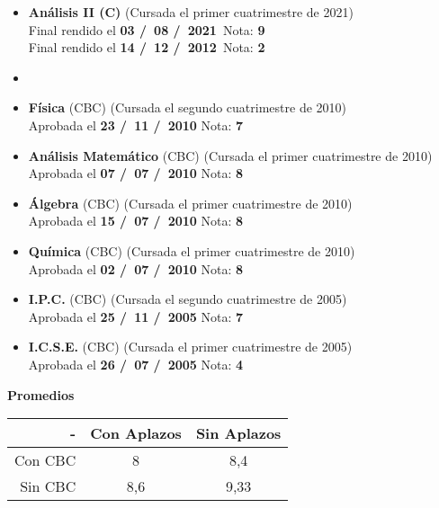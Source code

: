 \begin{itemize}[leftmargin=0.8cm]
  \item{\textbf{Análisis II (C)} (Cursada el primer cuatrimestre de 2021)\\
  Final rendido el \textbf{03 \slash \ 08 \slash \ 2021}\ \hfill Nota: \textbf{9}}\\
  Final rendido el \textbf{14 \slash \ 12 \slash \ 2012}\ \hfill Nota: \textbf{2}

  \item[] %

  \item{\textbf{Física} (CBC) (Cursada el segundo cuatrimestre de 2010)\\
  Aprobada el \textbf{23 \slash \ 11 \slash \ 2010} \hfill Nota: \textbf{7}}

  \item{\textbf{Análisis Matemático} (CBC) (Cursada el primer cuatrimestre de 2010)\\
  Aprobada el \textbf{07 \slash \ 07 \slash \ 2010} \hfill Nota: \textbf{8}}

  \item{\textbf{Álgebra} (CBC) (Cursada el primer cuatrimestre de 2010)\\
  Aprobada el \textbf{15 \slash \ 07 \slash \ 2010} \hfill Nota: \textbf{8}}

  \item{\textbf{Química} (CBC) (Cursada el primer cuatrimestre de 2010)\\
  Aprobada el \textbf{02 \slash \ 07 \slash \ 2010} \hfill Nota: \textbf{8}}

  \item{\textbf{I.P.C.} (CBC) (Cursada el segundo cuatrimestre de 2005)\\
  Aprobada el \textbf{25 \slash \ 11 \slash \ 2005} \hfill Nota: \textbf{7}}

  \item{\textbf{I.C.S.E.} (CBC) (Cursada el primer cuatrimestre de 2005)\\
  Aprobada el \textbf{26 \slash \ 07 \slash \ 2005} \hfill Nota: \textbf{4}}

\end{itemize}

\begin{center}
\textbf{Promedios}

  \begin{tabular}{|r|c|c|}
    \hline
    - & Con Aplazos & Sin Aplazos \\
    \hline
    Con CBC & 8 & 8,4 \\
    \hline
    Sin CBC & 8,6 & 9,33 \\
    \hline
  \end{tabular}

\end{center}
